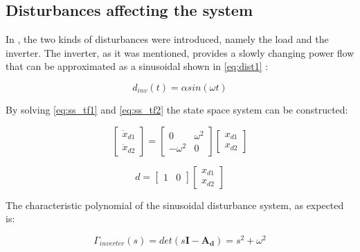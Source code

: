 \subsection{Disturbances affecting the system}
\label{disturbances}

In , the two kinds of disturbances were introduced, namely the load and the inverter. The inverter, as it was mentioned, provides a slowly changing power flow that can be approximated as a sinusoidal shown in \eqref{eq:dist1} : 

\begin{equation}
  \label{eq:dist1}
    d_{inv}(t) = \alpha sin(\omega t)
  \end{equation}

By solving \eqref{eq:ss_tf1} and \eqref{eq:ss_tf2} the state space system can be constructed: 


\begin{equation}
\label{eq:exo_statespace}
 \begin{bmatrix}
    \dot{x}_{d1} \\
    \dot{x}_{d2}
\end{bmatrix}
=
 \begin{bmatrix}
    0 & \omega^2 \\
    -\omega^2 & 0
\end{bmatrix}
 \begin{bmatrix}
    x_{d1} \\
    x_{d2}
\end{bmatrix}
\end{equation}

\begin{equation}
\label{eq:ss_dist2}
    d
=
 \begin{bmatrix}
    1 & 0 
\end{bmatrix}
 \begin{bmatrix}
    x_{d1} \\
    x_{d2}
\end{bmatrix}
\end{equation}

The characteristic polynomial of the sinusoidal disturbance system, as expected is: 

\begin{equation}
  \label{eq:distpoly}
    \Gamma_{inverter}(s) = det(s\mathbf{I}-\mathbf{A_d}) = s^2 + \omega^2 
  \end{equation}
  


